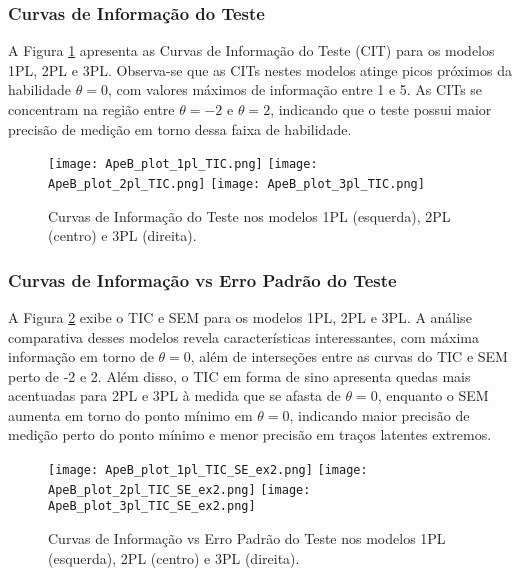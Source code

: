\subsubsection{Curvas de Informação do Teste}\label{sec:apeB_cit}

A Figura \ref{fig:ApeB_plot_TIC} apresenta as Curvas de Informação do Teste (CIT) para os modelos 1PL, 2PL e 3PL. Observa-se que as CITs nestes modelos atinge picos próximos da habilidade $\theta = 0$, com valores máximos de informação entre 1 e 5. As CITs se concentram na região entre $\theta = -2$ e $\theta = 2$, indicando que o teste possui maior precisão de medição em torno dessa faixa de habilidade. 

\begin{figure}[!ht]
    \centering
    \texttt{[image: ApeB\_plot\_1pl\_TIC.png]}
    \texttt{[image: ApeB\_plot\_2pl\_TIC.png]}
    \texttt{[image: ApeB\_plot\_3pl\_TIC.png]}
    \caption{Curvas de Informação do Teste nos modelos 1PL (esquerda), 2PL (centro) e 3PL (direita).}
    \label{fig:ApeB_plot_TIC}
    \end{figure}

\subsubsection{Curvas de Informação vs Erro Padrão do Teste}\label{sec:apeB_TIC_SE}

A Figura \ref{fig:ApeB_plot_TIC_SE} exibe o TIC e SEM para os modelos 1PL, 2PL e 3PL. A análise comparativa desses modelos revela características interessantes, com máxima informação em torno de $\theta = 0$, além de interseções entre as curvas do TIC e SEM perto de -2 e 2. Além disso, o TIC em forma de sino apresenta quedas mais acentuadas para 2PL e 3PL à medida que se afasta de $\theta = 0$, enquanto o SEM aumenta em torno do ponto mínimo em $\theta = 0$, indicando maior precisão de medição perto do ponto mínimo e menor precisão em traços latentes extremos.


\begin{figure}[!ht]
    \centering
    \texttt{[image: ApeB\_plot\_1pl\_TIC\_SE\_ex2.png]}
    \texttt{[image: ApeB\_plot\_2pl\_TIC\_SE\_ex2.png]} 
    \texttt{[image: ApeB\_plot\_3pl\_TIC\_SE\_ex2.png]}     
    \caption{Curvas de Informação vs Erro Padrão do Teste nos modelos 1PL (esquerda), 2PL (centro) e 3PL (direita).}
    \label{fig:ApeB_plot_TIC_SE}
    \end{figure}


